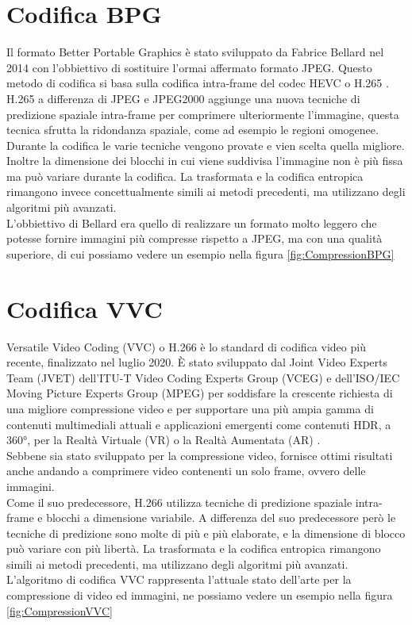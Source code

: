 \section{Codifica BPG}
Il formato Better Portable Graphics è stato sviluppato da Fabrice Bellard nel 2014 con l'obbiettivo di sostituire l’ormai affermato formato JPEG. Questo metodo di codifica si basa sulla codifica intra-frame del codec HEVC o H.265 \cite{BPGImageformat}.\\
H.265 a differenza di JPEG e JPEG2000 aggiunge una nuova tecniche di predizione spaziale intra-frame per comprimere ulteriormente l’immagine, questa tecnica sfrutta la ridondanza spaziale, come ad esempio le regioni omogenee. Durante la codifica le varie tecniche vengono provate e vien scelta quella migliore. Inoltre la dimensione dei blocchi in cui viene suddivisa l’immagine non è più fissa ma può variare durante la codifica.
La trasformata e la codifica entropica rimangono invece concettualmente simili ai metodi precedenti, ma utilizzano degli algoritmi più avanzati.\\
L’obbiettivo di  Bellard era quello di realizzare un formato molto leggero che potesse fornire immagini più compresse rispetto a JPEG, ma con una qualità superiore, di cui possiamo vedere un esempio nella figura \ref{fig:CompressionBPG}

\section{Codifica VVC}
Versatile Video Coding (VVC) o H.266 è lo standard di codifica video più recente, finalizzato nel luglio 2020. È stato sviluppato dal Joint Video Experts Team (JVET) dell'ITU-T Video Coding Experts Group (VCEG) e dell'ISO/IEC Moving Picture Experts Group (MPEG) per soddisfare la crescente richiesta di una migliore compressione video e per supportare una più ampia gamma di contenuti multimediali attuali e applicazioni emergenti come contenuti HDR, a 360°, per la Realtà Virtuale (VR) o la Realtà Aumentata (AR) \cite{9503377}.\\
Sebbene sia stato sviluppato per la compressione video, fornisce ottimi risultati anche andando a comprimere video contenenti un solo frame, ovvero delle immagini.\\
Come il suo predecessore, H.266 utilizza tecniche di predizione spaziale intra-frame e blocchi a dimensione variabile. A differenza del suo predecessore però le tecniche di predizione sono molte di più e più elaborate, e la dimensione di blocco può variare con più libertà.
La trasformata e la codifica entropica rimangono simili ai metodi precedenti, ma utilizzano degli algoritmi più avanzati.\\
L’algoritmo di codifica VVC rappresenta l’attuale stato dell’arte per la compressione di video ed immagini, ne possiamo vedere un esempio nella figura \ref{fig:CompressionVVC}
\newline

